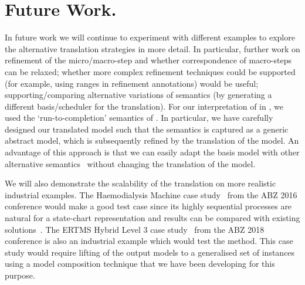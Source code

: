 
\section{Future Work.}
\label{sec:future}
In future work we will continue to experiment with different examples to explore the alternative translation strategies in more detail. 
In particular, further work on refinement of the micro/macro-step and whether correspondence of macro-steps can be relaxed; whether more complex refinement techniques could be supported (for example, using ranges in refinement annotations) would be useful; supporting/comparing alternative variations of semantics (by generating a different basis/scheduler for the translation).
For our interpretation of \statecharts in \iUMLB, we used the `run-to-completion' semantics of \statecharts.  In particular, we have carefully designed our translated model such that the semantics is captured as a generic abstract model, which is subsequently refined by the translation of the \SCXML model.  An advantage of this approach is that we can easily adapt the basis model with other alternative semantics~\mbox{\cite{Eshuis_2009}} without changing the translation of the \SCXML model. 

We will also demonstrate the scalability of the translation on more realistic industrial examples. 
The Haemodialysis Machine case study~\mbox{\cite{Mashkoor16}} from the ABZ 2016 conference would make a good test case since its highly sequential processes are natural for a state-chart representation and results can be compared with existing \mbox{\iUMLB} solutions~\mbox{\cite{HoSnLaBu16}}. 
The ERTMS Hybrid Level 3 case study~\mbox{\cite{HoBuRe18}} from the ABZ 2018 conference is also an industrial example which would test the method. 
This case study would require lifting of the output models to a generalised set of instances using a model composition technique that we have been developing for this purpose.


